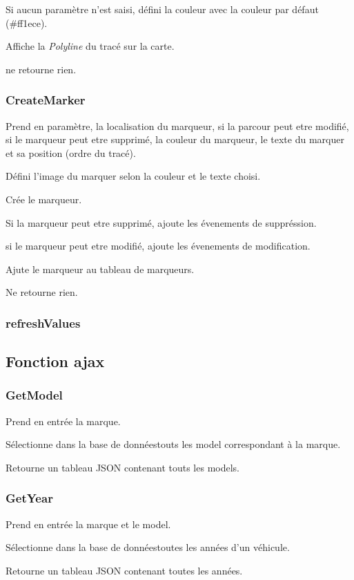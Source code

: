 \documentclass[a4paper]{article}
\newcommand{\bdd}{base de données}
\begin{document}
Si aucun paramètre n'est saisi, défini la couleur avec la couleur par défaut (\#ff1ece).

Affiche la \emph{Polyline} du tracé sur la carte.

ne retourne rien.

\subsubsection{CreateMarker}
Prend en paramètre, la localisation du marqueur, si la parcour peut etre modifié, si le marqueur peut etre supprimé, la couleur du marqueur, le texte du marquer et sa position (ordre du tracé).

Défini l'image du marquer selon la couleur et le texte choisi.

Crée le marqueur.

Si la marqueur peut etre supprimé, ajoute les évenements de suppréssion.

si le marqueur peut etre modifié, ajoute les évenements de modification.

Ajute le marqueur au tableau de marqueurs.

Ne retourne rien.

\subsubsection{refreshValues}


\subsection{Fonction ajax}

\subsubsection{GetModel}
Prend en entrée la marque.

Sélectionne dans la \bdd touts les model correspondant à la marque.

Retourne un tableau JSON contenant touts les models.

\subsubsection{GetYear}	
Prend en entrée la marque et le model.

Sélectionne dans la \bdd toutes les années d'un véhicule.

Retourne un tableau JSON contenant toutes les années.
\end{document}
